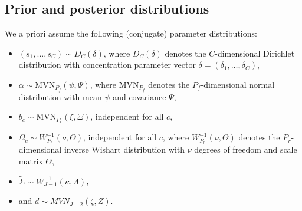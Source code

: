 \documentclass[article,shortnames]{jss}
\begin{document}
\subsection{Prior and posterior distributions} \label{subsec:prior_and_posterior}

We a priori assume the following (conjugate) parameter distributions:
\begin{itemize}
  \item $(s_1,\dots,s_C)\sim D_C(\delta)$, where $D_C(\delta)$ denotes the $C$-dimensional Dirichlet distribution with concentration parameter vector $\delta = (\delta_1,\dots,\delta_C)$,
  \item $\alpha\sim \text{MVN}_{P_f}(\psi,\Psi)$, where $\text{MVN}_{P_f}$ denotes the $P_f$-dimensional normal distribution with mean $\psi$ and covariance $\Psi$,
  \item $b_c \sim \text{MVN}_{P_r}(\xi,\Xi)$, independent for all $c$,
  \item $\Omega_c \sim W^{-1}_{P_r}(\nu,\Theta)$, independent for all $c$, where $W^{-1}_{P_r}(\nu,\Theta)$ denotes the $P_r$-dimensional inverse Wishart distribution with $\nu$ degrees of freedom and scale matrix $\Theta$,
  \item $\tilde{\Sigma} \sim W^{-1}_{J-1}(\kappa,\Lambda)$,
  \item and $d \sim MVN_{J-2}(\zeta,Z)$.
\end{itemize}
\end{document}

